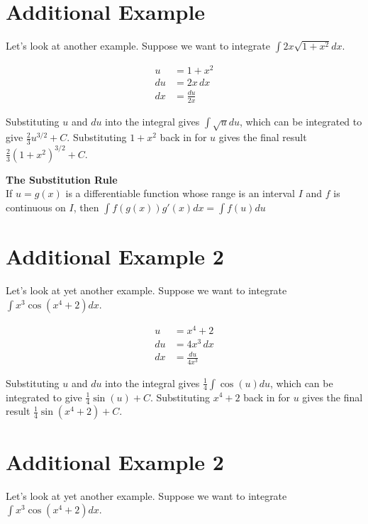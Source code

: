 \documentclass{article}
\begin{document}
\section{Additional Example}
Let's look at another example. Suppose we want to integrate $\int 2x \sqrt{1+x^2} dx$.

\begin{align*}
    u &= 1 + x^2 \\
    du &= 2x \, dx \\
    dx &= \frac{du}{2x}
\end{align*}

Substituting $u$ and $du$ into the integral gives $\int \sqrt{u} du$, which can be integrated to give $\frac{2}{3}u^{3/2} + C$. Substituting $1+x^2$ back in for $u$ gives the final result $\frac{2}{3}(1+x^2)^{3/2} + C$.

\begin{tcolorbox}[colback=red!5!white,colframe=red!75!black]
    \begin{center}
      \textbf{The Substitution Rule} \\
      If $u = g(x)$ is a differentiable function whose range is an interval $I$ and $f$ is continuous on $I$, then $\int f(g(x)) g'(x) dx = \int f(u) du$
    \end{center}
  \end{tcolorbox}

  \section{Additional Example 2}
Let's look at yet another example. Suppose we want to integrate $\int x^3 \cos(x^4 + 2) dx$.

\begin{align*}
    u &= x^4 + 2 \\
    du &= 4x^3 \, dx \\
    dx &= \frac{du}{4x^3}
\end{align*}

Substituting $u$ and $du$ into the integral gives $\frac{1}{4} \int \cos(u) du$, which can be integrated to give $\frac{1}{4} \sin(u) + C$. Substituting $x^4 + 2$ back in for $u$ gives the final result $\frac{1}{4} \sin(x^4 + 2) + C$.

\section{Additional Example 2}
Let's look at yet another example. Suppose we want to integrate $\int x^3 \cos(x^4 + 2) dx$.
\end{document}

